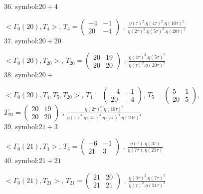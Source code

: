 36. symbol:$ 20+4 $

$ < \Gamma_0 ( 20 ), T_4 >  $,
$
T_4 = 
\left(
\begin{array}{cc}
-4 & -1 \\
20 & -4
\end{array}
\right)
$
, {$ \frac{\eta(\tau)^2 . \eta(4\tau)^2 . \eta(10\tau)^2}{\eta(2\tau)^2 . \eta(5\tau)^2 . \eta(20\tau)^2} $}
\\

37. symbol:$ 20+20 $

$ < \Gamma_0 ( 20 ), T_{20} >  $,
$
T_{20} = 
\left(
\begin{array}{cc}
20 & 19 \\
20 & 20
\end{array}
\right)
$
, {$ \frac{\eta(4\tau)^2 . \eta(5\tau)^2}{\eta(\tau)^2 . \eta(20\tau)^2} $}
\\

38. symbol:$ 20+ $

$ < \Gamma_0 ( 20 ), T_4, T_5, T_{20} >  $,
$
T_4 = 
\left(
\begin{array}{cc}
-4 & -1 \\
20 & -4
\end{array}
\right)
$,
$
T_5 = 
\left(
\begin{array}{cc}
5 & 1 \\
20 & 5
\end{array}
\right)
$,
$
T_{20} = 
\left(
\begin{array}{cc}
20 & 19 \\
20 & 20
\end{array}
\right)
$
, {$ \frac{\eta(2\tau)^8 . \eta(10\tau)^8}{\eta(\tau)^4 .\eta(4\tau)^4 .\eta(5\tau)^4. \eta(20\tau)^4} $}
\\

39. symbol:$ 21+3 $

$ < \Gamma_0 ( 21 ), T_3 >  $,
$
T_3 = 
\left(
\begin{array}{cc}
-6 & -1 \\
21 & 3
\end{array}
\right)
$
, {$ \frac{\eta(\tau) . \eta(3\tau)}{\eta(7\tau) . \eta(21\tau)} $}
\\

40. symbol:$ 21+21 $

$ < \Gamma_0 ( 21 ), T_{21} >  $,
$
T_{21} = 
\left(
\begin{array}{cc}
21 & 20 \\
21 & 21
\end{array}
\right)
$
, {$ \frac{\eta(3\tau)^2 . \eta(7\tau)^2}{\eta(\tau)^2 . \eta(21\tau)^2} $}
\\

